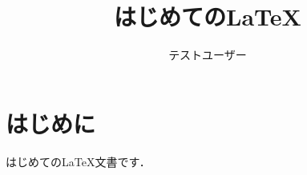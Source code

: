\documentclass[a4j]{jarticle}
\title{はじめての\LaTeX}
\author{テストユーザー}
\begin{document}
  \maketitle
  \section{はじめに}
  はじめての\LaTeX 文書です．
\end{document}
